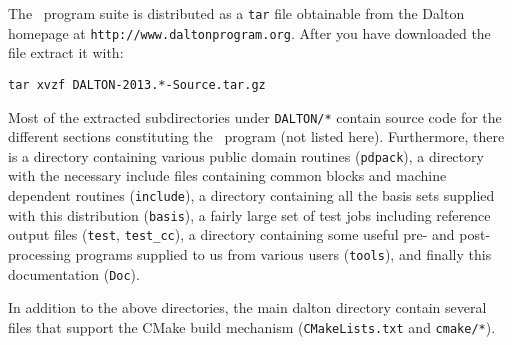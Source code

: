 The \latestrelease\ program suite is distributed as a \verb|tar|
file obtainable from
the Dalton homepage at \verb|http://www.daltonprogram.org|.
After you have downloaded the file extract it with:
\begin{verbatim}
tar xvzf DALTON-2013.*-Source.tar.gz
\end{verbatim}
Most of the extracted subdirectories under \verb|DALTON/*| contain source code for the different
sections constituting the \dalton\ program (not listed here).
Furthermore, there is a
directory containing various public domain routines (\verb|pdpack|), a
directory with the necessary include files containing common blocks and machine
dependent routines (\verb|include|), a directory containing all the basis sets
supplied with this distribution (\verb|basis|), a fairly large set of test jobs
including reference output files (\verb|test|, \verb|test_cc|), a directory
containing some useful pre- and post-processing programs supplied to us from
various users (\verb|tools|), and finally this documentation (\verb|Doc|). 

In addition to the above directories, the main dalton directory contain several
files that support the CMake build mechanism (\verb|CMakeLists.txt| and \verb|cmake/*|).
